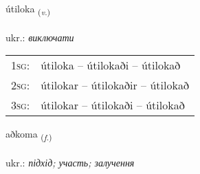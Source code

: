 \documentclass[frontgrid, backgrid]{flacards}\usepackage[]{graphicx}\usepackage[]{xcolor}
\begin{document}
\renewcommand{\flhead}{\vskip5pt \fboxsep=0pt {\small\bfseries\footnotesize Sagnorð | дієслово}}
\renewcommand{\fcfoot}{\vskip5pt \fboxsep=0pt \hspace{2pt}{\small\bfseries\footnotesize 3K}}

\renewcommand{\blhead}{\vskip5pt {\small\bfseries\footnotesize Sagnorð | дієслово }}
\renewcommand{\bcfoot}{\vskip5pt \hspace{2pt}{\small\bfseries\footnotesize 3K}}


{útiloka \small{\textsubscript{(\textit{v.})}} \\[1ex] %
\textphonetic{[uːtɪlɔka]} \\
ukr.: \emph{виключати} \\  [2ex]
\renewcommand*{\arraystretch}{0.8}
\begin{tabular}{p{1cm}l}
\textsc{1sg}: & útiloka -- útilokaði -- útilokað \\ 
\textsc{2sg}: & útilokar -- útilokaðir -- útilokað \\ 
\textsc{3sg}: & útilokar -- útilokaði -- útilokað \\ 
\end{tabular}
}

\renewcommand{\flhead}{\vskip5pt \fboxsep=0pt {\small\bfseries\footnotesize Nafnorð | іменник}}
\renewcommand{\fcfoot}{\vskip5pt \fboxsep=0pt \hspace{2pt}{\small\bfseries\footnotesize 3K}}

\renewcommand{\blhead}{\vskip5pt {\small\bfseries\footnotesize Nafnorð | іменник }}
\renewcommand{\bcfoot}{\vskip5pt \hspace{2pt}{\small\bfseries\footnotesize 3K}}


{aðkoma \small{\textsubscript{(\textit{f.})}} \\[1ex] %
\textphonetic{[aðkʰɔma]} \\
ukr.: \emph{підхід; участь; залучення} \\  [2ex]
\renewcommand*{\arraystretch}{0.8}
}
\end{document}
